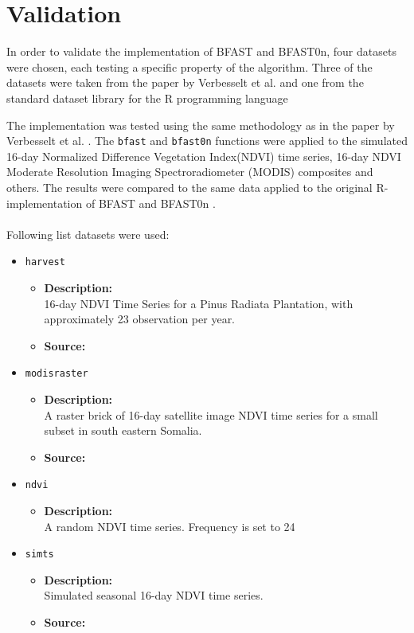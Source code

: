\documentclass[main.tex]{subfiles}
\begin{document}
\chapter{Validation}
\label{chap:validation}
In order to validate the implementation of BFAST and BFAST0n, four datasets were
chosen, each testing a specific property of the algorithm. Three of the datasets were
taken from the paper by Verbesselt et al. \cite{bfast} and one from the standard
dataset library for the R programming language \cite{r-datasets}

The implementation was tested using the same methodology as in the paper by
Verbesselt et al. \cite{bfast}. The \texttt{bfast} and \texttt{bfast0n}
functions were applied to the simulated 16-day Normalized Difference Vegetation
Index(NDVI) time series, 16-day NDVI Moderate Resolution Imaging
Spectroradiometer (MODIS) composites and others. The results were compared to
the same data applied to the original R-implementation of BFAST and BFAST0n
\cite{bfast-github}.\\\\ 
Following list datasets were used:
\begin{itemize}
\item \texttt{harvest}
  \begin{itemize}
  \item \textbf{Description:}\\
  16-day NDVI Time Series for a Pinus Radiata Plantation, with approximately 23
  observation per year.
  \item \textbf{Source:} \cite{bfast}
  \end{itemize}
\item \texttt{modisraster}
  \begin{itemize}
  \item \textbf{Description:}\\ A raster brick of 16-day satellite image NDVI
    time series for a small subset in south eastern Somalia.
  \item \textbf{Source:} \cite{bfast_monitor1}
  \end{itemize}
\item \texttt{ndvi}
  \begin{itemize}
  \item \textbf{Description:}\\ A random NDVI time series. Frequency is set to 24
  \end{itemize}
\item \texttt{simts}
  \begin{itemize}
  \item \textbf{Description:}\\ Simulated seasonal 16-day NDVI time series.
  \item \textbf{Source:} \cite{bfast}
  \end{itemize}
\end{itemize}
\end{document}
